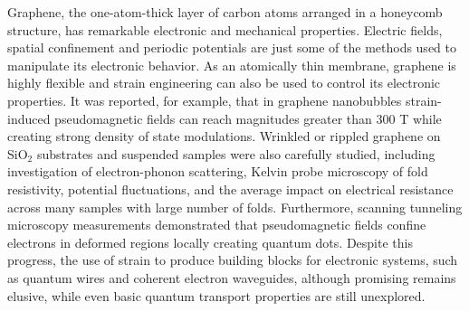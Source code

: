 \documentclass[journal=jacsat,manuscript=article]{achemso}
\begin{document}
Graphene, the one-atom-thick layer of carbon atoms arranged in a honeycomb structure, has remarkable electronic and mechanical properties\cite{geim2007rise,neto2009electronic}. Electric fields\cite{castro2007biased,mak2009observation,ohta2006controlling}, spatial confinement\cite{Han2007energy,son2006half,Li2008,jacobse_electronic_2017,baringhaus_exceptional_2014} and periodic potentials\cite{dean2013hofstadter,ponomarenko2013cloning,cheng2016gate,wang2015topological,hunt2013massive} are just some of the methods used to manipulate its electronic behavior. As an atomically thin membrane, graphene is highly flexible\cite{eda2008large,lee2008measurement} and strain engineering can also be used to control its electronic properties\cite{pereira2009strain,levy2010strain,guinea2010energy,Vozmediano2010,Carrillo-Bastos2014,Carrillo-Bastos2016, rasmussen_electronic_2013}. It was reported, for example, that in graphene nanobubbles strain-induced pseudomagnetic fields can reach magnitudes greater than 300 T\cite{levy2010strain} while creating strong density of state modulations. Wrinkled or rippled graphene on SiO$_2$ substrates\cite{Ni2012, Zhu2012, Shioya2015, willke_local_2016} and suspended samples\cite{Bao2009} were also carefully studied, including investigation of electron-phonon scattering\cite{Ni2012}, Kelvin probe microscopy of fold resistivity,\cite{willke_local_2016} potential fluctuations\cite{Shioya2015}, and the average impact on electrical resistance across many samples with large number of folds\cite{Zhu2012}. Furthermore, scanning tunneling microscopy measurements\cite{klimov2012electromechanical} demonstrated that pseudomagnetic fields confine electrons in deformed regions locally creating quantum dots. Despite this progress, the use of strain to produce building blocks for electronic systems, such as quantum wires and coherent electron waveguides, although promising\cite{andrei2017folds} remains elusive, while even basic quantum transport properties are still unexplored. 
\end{document}
